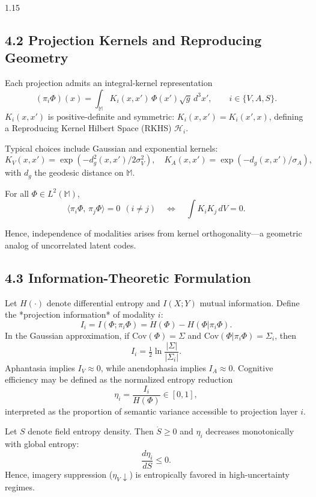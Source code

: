 \documentclass[12pt,a4paper]{article}
\begin{document}
\begin{spacing}{1.15}
\subsection{4.2 Projection Kernels and Reproducing Geometry}

Each projection admits an integral-kernel representation
\begin{equation}
(\pi_i\Phi)(x)
=\int_{\mathbb{M}}K_i(x,x')\,\Phi(x')\sqrt{g}\,d^3x',
\qquad i\in\{V,A,S\}.
\label{eq:proj-kernel}
\end{equation}
$K_i(x,x')$ is positive-definite and symmetric: $K_i(x,x')=K_i(x',x)$, defining a Reproducing Kernel Hilbert Space (RKHS) $\mathcal{H}_i$.  

Typical choices include Gaussian and exponential kernels:
\[
K_V(x,x')=\exp(-d_g^2(x,x')/2\sigma_V^2),
\quad
K_A(x,x')=\exp(-d_g(x,x')/\sigma_A),
\]
with $d_g$ the geodesic distance on $\mathbb{M}$.

\begin{lemma}
For all $\Phi\in L^2(\mathbb{M})$,
\[
\langle \pi_i\Phi,\,\pi_j\Phi\rangle
=0 \ \ (i\neq j)
\quad\Leftrightarrow\quad
\int K_iK_j\,dV=0.
\]
\end{lemma}

Hence, independence of modalities arises from kernel orthogonality—a geometric analog of uncorrelated latent codes.

\subsection{4.3 Information-Theoretic Formulation}

Let $H(\cdot)$ denote differential entropy and $I(X;Y)$ mutual information.  
Define the *projection information* of modality $i$:
\begin{equation}
I_i=I(\Phi;\pi_i\Phi)=H(\Phi)-H(\Phi|\pi_i\Phi).
\label{eq:Iproj}
\end{equation}
In the Gaussian approximation, if $\mathrm{Cov}(\Phi)=\Sigma$ and
$\mathrm{Cov}(\Phi|\pi_i\Phi)=\Sigma_i$,
then
\[
I_i=\tfrac{1}{2}\ln\frac{|\Sigma|}{|\Sigma_i|}.
\]
Aphantasia implies $I_V\approx0$, while anendophasia implies $I_A\approx0$.  
Cognitive efficiency may be defined as the normalized entropy reduction
\[
\eta_i=\frac{I_i}{H(\Phi)}\in[0,1],
\]
interpreted as the proportion of semantic variance accessible to projection layer $i$.

\begin{proposition}
Let $S$ denote field entropy density.  
Then $\dot S\ge0$ and $\eta_i$ decreases monotonically with global entropy:
\[
\frac{d\eta_i}{dS}\le0.
\]
Hence, imagery suppression ($\eta_V\!\downarrow$) is entropically favored in high-uncertainty regimes.
\end{proposition}


\end{spacing}
\end{document}
